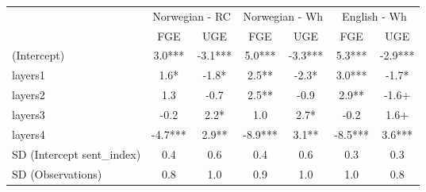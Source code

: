 \begin{longtable}{lcccccc}
\toprule
 & \multicolumn{2}{c}{Norwegian - RC} & \multicolumn{2}{c}{Norwegian - Wh} & \multicolumn{2}{c}{English - Wh} \\ 
\cmidrule(lr){2-3} \cmidrule(lr){4-5} \cmidrule(lr){6-7}
  & FGE & UGE & FGE & UGE & FGE & UGE \\ 
\midrule\addlinespace[2.5pt]
(Intercept) & 3.0*** & -3.1*** & 5.0*** & -3.3*** & 5.3*** & -2.9*** \\ 
layers1 & 1.6* & -1.8* & 2.5** & -2.3* & 3.0*** & -1.7* \\ 
layers2 & 1.3 & -0.7 & 2.5** & -0.9 & 2.9** & -1.6+ \\ 
layers3 & -0.2 & 2.2* & 1.0 & 2.7* & -0.2 & 1.6+ \\ 
layers4 & -4.7*** & 2.9** & -8.9*** & 3.1** & -8.5*** & 3.6*** \\ 
SD (Intercept sent\_index) & 0.4 & 0.6 & 0.4 & 0.6 & 0.3 & 0.3 \\ 
SD (Observations) & 0.8 & 1.0 & 0.9 & 1.0 & 1.0 & 0.8 \\ 
\bottomrule
\end{longtable}

